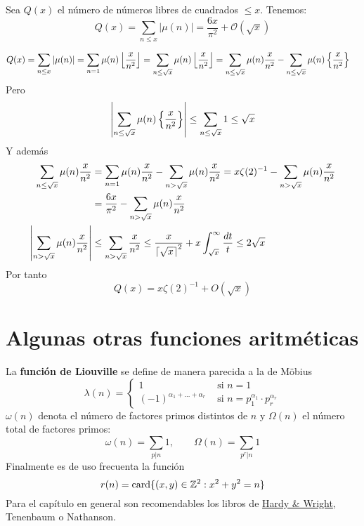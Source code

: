 \documentclass[TAN.tex]{subfiles}
\begin{document}
\begin{teorema}
Sea $Q(x)$ el número de números libres de cuadrados $≤x$. Tenemos:
\[ Q(x) = \sum_{n≤x} |μ(n)| = \frac{6x}{π^2} + \mathcal{O}(\sqrt{x}) \]
\end{teorema}
\begin{dem}
\begin{align*}
Q(x)&=\sum_{n\leq x}\left|\mu(n)\right| = \sum_{n=1}\mu(n)\left\lfloor{\frac{x}{n^2}}\right\rfloor = \sum_{n\leq \sqrt{x}}\mu(n)\left\lfloor{\frac{x}{n^2}}\right\rfloor = \sum_{n\leq \sqrt{x}}\mu(n){\frac{x}{n^2}}  - \sum_{n\leq \sqrt{x}}\mu(n)\left\{{\frac{x}{n^2}}\right\} 
\end{align*}
Pero 
$$
\left|\sum_{n\leq \sqrt{x}}\mu(n)\left\{{\frac{x}{n^2}}\right\}  \right|\leq \sum_{n\leq \sqrt{x}}1 \leq \sqrt{x}
$$
Y además
\begin{align*}
\sum_{n\leq \sqrt{x}}\mu(n){\frac{x}{n^2}}  &= \sum_{n=1}\mu(n){\frac{x}{n^2}}  - \sum_{n>\sqrt{x}}\mu(n){\frac{x}{n^2}} = x\zeta(2)^{-1} - \sum_{n>\sqrt{x}}\mu(n){\frac{x}{n^2}}\\
&=\frac{6x}{\pi^2} - \sum_{n>\sqrt{x}}\mu(n){\frac{x}{n^2}}\\
\left|\sum_{n>\sqrt{x}}\mu(n){\frac{x}{n^2}}\right|&\leq \sum_{n>\sqrt{x}}{\frac{x}{n^2}} \leq \frac{x}{\left\lceil{\sqrt{x}}\right\rceil^2}+x\int_{\sqrt{x}}^\infty \frac{dt}{t} \leq 2\sqrt{x}
\end{align*}
Por tanto
$$
Q(x) = x\zeta(2)^{-1} + O(\sqrt{x}) 
$$
\end{dem}
\section{Algunas otras funciones aritméticas}
La \textbf{función de Liouville} se define de manera parecida a la de Möbius
\[ λ(n) = \begin{cases}
	1 &\text{ si }n=1\\
	(-1)^{α_1+\dots+α_r} &\text{ si }n=p_1^{α_1}\cdot p_r^{α_r}
\end{cases} \]
$ω(n)$ denota el número de factores primos distintos de $n$ y $Ω(n)$ el número total de factores primos:
\[ ω(n) = \sum_{p|n} 1, \qquad Ω(n) = \sum_{p^r|n} 1 \]
Finalmente es de uso frecuenta la función
\[ r(n) = \text{card}\{(x,y) \in \mathbb{Z}^2 : x^2+y^2=n\} \]
Para el capítulo en general son recomendables los libros de \href{https://leonettipaolo.files.wordpress.com/2012/07/ebook-english-g-h-hardy-an-introduction-to-the-theory-of-numbers.pdf}{Hardy \& Wright}, Tenenbaum o Nathanson.
\end{document}
